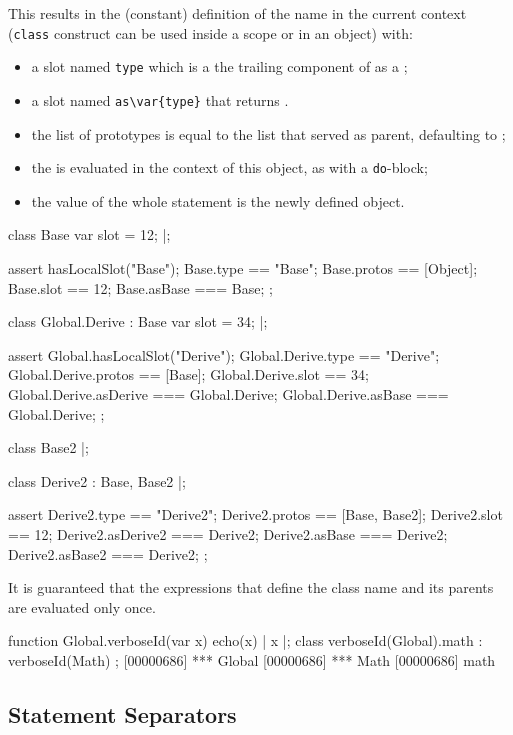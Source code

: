 This results in the (constant) definition of the name  in the
current context (\lstinline|class| construct can be used inside a scope or
in an object) with:
\begin{itemize}
\item a slot named \lstinline|type| which is a the trailing component of
   as a ;
\item a slot named \lstinline|as\var{type}| that returns \this.
\item the list of prototypes is equal to the list  that
  served as parent, defaulting to ;
\item the  is evaluated in the context of this object, as with a
  \lstinline|do|-block;
\item the value of the whole statement is the newly defined object.
\end{itemize}

\begin{urbiscript}
class Base
{
  var slot = 12;
}|;

assert
{
  hasLocalSlot("Base");
  Base.type   == "Base";
  Base.protos == [Object];
  Base.slot   == 12;
  Base.asBase === Base;
};

class Global.Derive : Base
{
  var slot = 34;
}|;

assert
{
  Global.hasLocalSlot("Derive");
  Global.Derive.type     == "Derive";
  Global.Derive.protos   == [Base];
  Global.Derive.slot     == 34;
  Global.Derive.asDerive === Global.Derive;
  Global.Derive.asBase   === Global.Derive;
};

class Base2 {}|;

class Derive2 : Base, Base2 {}|;

assert
{
  Derive2.type      == "Derive2";
  Derive2.protos    == [Base, Base2];
  Derive2.slot      == 12;
  Derive2.asDerive2 === Derive2;
  Derive2.asBase    === Derive2;
  Derive2.asBase2   === Derive2;
};
\end{urbiscript}

It is guaranteed that the expressions that define the class name and its
parents are evaluated only once.

\begin{urbiscript}
function Global.verboseId(var x)
{
  echo(x) | x
}|;
class verboseId(Global).math : verboseId(Math)
{
};
[00000686] *** Global
[00000686] *** Math
[00000686] math
\end{urbiscript}


\subsection{Statement Separators}
\label{sec:lang:separators}

